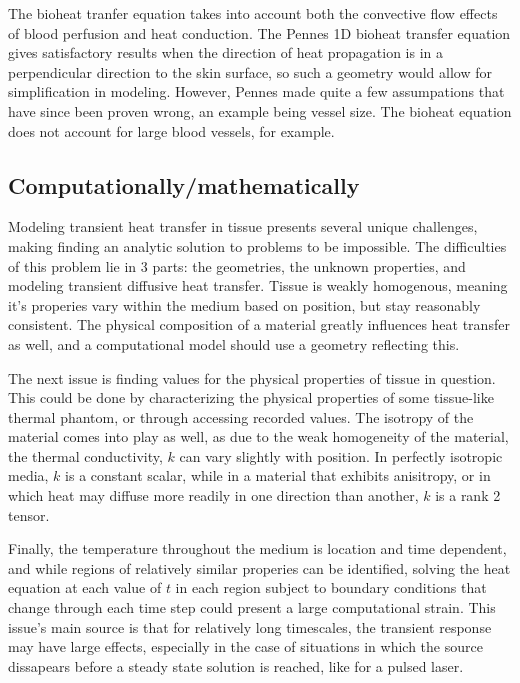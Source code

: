 \documentclass[12pt]{article}
\begin{document}
The bioheat tranfer equation takes into account both the convective flow effects of blood perfusion and heat conduction. The Pennes 1D bioheat transfer equation gives satisfactory results when the direction of heat propagation is in a perpendicular direction to the skin surface, so such a geometry would allow for simplification in modeling. 
However, Pennes made quite a few assumpations that have since been proven wrong, an example being vessel size. The bioheat equation does not account for large blood vessels, for example. 
	
\subsection{Computationally/mathematically}
Modeling transient heat transfer in tissue presents several unique challenges, making finding an analytic solution to problems to be impossible. The difficulties of this problem lie in 3 parts: the geometries, the unknown properties, and modeling transient diffusive heat transfer.
Tissue is weakly homogenous, meaning it's properies vary within the medium based on position, but stay reasonably consistent. The physical composition of a material greatly influences heat transfer as well, and a computational model should use a geometry reflecting this.  

The next issue is finding values for the physical properties of tissue in question. This could be done by characterizing the physical properties of some tissue-like thermal phantom, or through accessing recorded values. The isotropy of the material comes into play as well, as due to the weak homogeneity of the material, the thermal conductivity, $k$ can vary slightly with position. In perfectly isotropic media, $k$ is a constant scalar, while in a material that exhibits anisitropy, or in which heat may diffuse more readily in one direction than another, $k$ is a rank 2 tensor. 

Finally, the temperature throughout the medium is location and time dependent, and while regions of relatively similar properies can be identified, solving the heat equation at each value of $t$ in each region subject to boundary conditions that change through each time step could present a large computational strain. This issue's main source is that for relatively long timescales, the transient response may have large effects, especially in the case of situations in which the source dissapears before a steady state solution is reached, like for a pulsed laser. 
\end{document}
